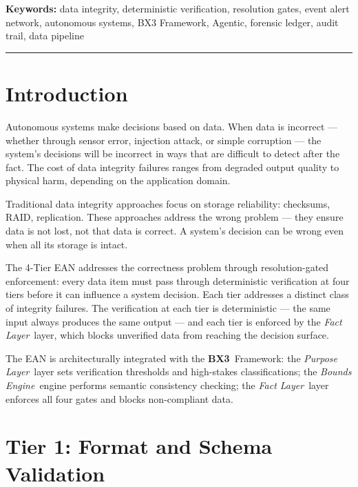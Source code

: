 \documentclass[12pt]{article}
\newcommand{\bxthree}{\textbf{BX3}}
\newcommand{\purpose}{\textit{Purpose Layer}}
\newcommand{\bounds}{\textit{Bounds Engine}}
\newcommand{\fact}{\textit{Fact Layer}}
\begin{document}
\vspace{0.5em}
\noindent\textbf{Keywords:} data integrity, deterministic verification, resolution gates, event alert network, autonomous systems, BX3 Framework, Agentic, forensic ledger, audit trail, data pipeline

\vspace{1em}
\hrule
\vspace{1em}

\onehalfspacing

\section{Introduction}
\label{sec:intro}

Autonomous systems make decisions based on data. When data is incorrect — whether through sensor error, injection attack, or simple corruption — the system's decisions will be incorrect in ways that are difficult to detect after the fact. The cost of data integrity failures ranges from degraded output quality to physical harm, depending on the application domain.

Traditional data integrity approaches focus on storage reliability: checksums, RAID, replication. These approaches address the wrong problem — they ensure data is not lost, not that data is correct. A system's decision can be wrong even when all its storage is intact.

The 4-Tier EAN addresses the correctness problem through resolution-gated enforcement: every data item must pass through deterministic verification at four tiers before it can influence a system decision. Each tier addresses a distinct class of integrity failures. The verification at each tier is deterministic — the same input always produces the same output — and each tier is enforced by the \fact\ layer, which blocks unverified data from reaching the decision surface.

The EAN is architecturally integrated with the \bxthree\ Framework: the \purpose\ layer sets verification thresholds and high-stakes classifications; the \bounds\ engine performs semantic consistency checking; the \fact\ layer enforces all four gates and blocks non-compliant data.

\section{Tier 1: Format and Schema Validation}
\label{sec:tier1}
\end{document}
